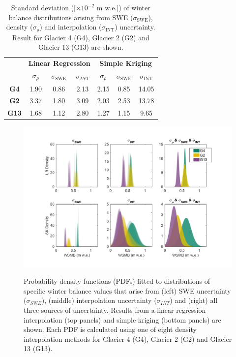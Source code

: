 \documentclass[review,oneside, letterpaper]{igs}
\begin{document}
 \begin{table}[]
\centering
\caption{Standard deviation ([$\times10^{-2}$ m w.e.]) of winter balance distributions arising from SWE ($\sigma_{\mathrm{SWE}}$), density ($\sigma_{\rho}$) and interpolation ($\sigma_{\mathrm{INT}}$) uncertainty. Result for Glacier 4 (G4), Glacier 2 (G2) and Glacier 13 (G13) are shown.}
\label{tab:WSMBdistribution_sigma}
\begin{tabular}{ccccccc}
\textbf{} & \multicolumn{3}{c}{\textbf{Linear Regression}} & \multicolumn{3}{c}{\textbf{Simple Kriging}} \\
 & $\sigma_{\rho}$ & $\sigma_{\mathrm{SWE}}$ & $\sigma_{INT}$ & $\sigma_{\rho}$ & $\sigma_{\mathrm{SWE}}$ & $\sigma_{\mathrm{INT}}$ \\
\midrule
\textbf{G4} & 1.90 & 0.86 & 2.13 & 2.15 & 0.85 & 14.05 \\
\textbf{G2} &3.37 & 1.80 & 3.09 & 2.03 & 2.53 & 13.78 \\
\textbf{G13} & 1.68 & 1.12 & 2.80 & 1.27 & 1.15 & 9.65
\end{tabular}
\end{table}

\begin{figure}
	\centering
\hspace*{-1.2cm}
	\includegraphics[width =1.1\textwidth]{WSMBDist.pdf}\\
	\caption{Probability density functions (PDFs) fitted to distributions of specific winter balance values that arise from (left) SWE uncertainty ($\sigma_{SWE}$), (middle) interpolation uncertainty ($\sigma_{INT}$) and (right) all three sources of uncertainty. Results from a linear regression interpolation (top panels) and simple kriging (bottom panels) are shown. Each PDF is calculated using one of eight density interpolation methods for Glacier 4 (G4), Glacier 2 (G2) and Glacier 13 (G13).}
	\label{fig:WSMBDist_LR}
\end{figure}
\end{document}
